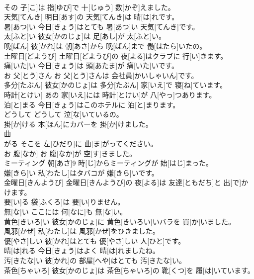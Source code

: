 \documentclass[8pt]{extreport}
\begin{document}
\begin{CJK}{UTF8}{min}
\\	[じゅう]	その 子[こ]は 指[ゆび]で 十[じゅう] 数[かぞ]えました。		
\\	天気[てんき]	明日[あす]の 天気[てんき]は 晴[は]れです。		
\\	暑[あつ]い	今日[きょう]はとても 暑[あつ]い 天気[てんき]です。		
\\	太[ふと]い	彼女[かのじょ]は 足[あし]が 太[ふと]い。		
\\	晩[ばん]	彼[かれ]は 朝[あさ]から 晩[ばん]まで 働[はたら]いたの。		
\\	土曜日[どようび]	土曜日[どようび]の 夜[よる]はクラブに 行[い]きます。		
\\	痛[いた]い	今日[きょう]は 頭[あたま]が 痛[いた]いです。		
\\	お 父[とう]さん	お 父[とう]さんは 会社員[かいしゃいん]です。		
\\	多分[たぶん]	彼女[かのじょ]は 多分[たぶん] 家[いえ]で 寝[ね]ています。		
\\	時計[とけい]	あの 家[いえ]には 時計[とけい]が 八[やっ]つあります。		
\\	泊[と]まる	今日[きょう]はこのホテルに 泊[と]まります。		
\\	どうして	どうして 泣[な]いているの。		
\\	掛[か]ける	本[ほん]にカバーを 掛[か]けました。		
\\	曲
\\	[ま]がる	そこを 左[ひだり]に 曲[ま]がってください。		
\\	お 腹[なか]	お 腹[なか]が 空[す]きました。		
\\	ミーティング	朝[あさ]9 時[じ]からミーティングが 始[はじ]まった。		
\\	嫌[きら]い	私[わたし]はタバコが 嫌[きら]いです。		
\\	金曜日[きんようび]	金曜日[きんようび]の 夜[よる]は 友達[ともだち]と 出[で]かけます。		
\\	要[い]る	袋[ふくろ]は 要[い]りません。		
\\	無[な]い	ここには 何[なに]も 無[な]い。		
\\	黄色[きいろ]い	彼女[かのじょ]に 黄色[きいろい]いバラを 買[か]いました。		
\\	風邪[かぜ]	私[わたし]は 風邪[かぜ]をひきました。		
\\	優[やさ]しい	彼[かれ]はとても 優[やさ]しい 人[ひと]です。		
\\	晴[は]れる	今日[きょう]はよく 晴[は]れましたね。		
\\	汚[きたな]い	彼[かれ]の 部屋[へや]はとても 汚[きたな]い。		
\\	茶色[ちゃいろ]	彼女[かのじょ]は 茶色[ちゃいろ]の 靴[くつ]を 履[は]いています。		

\end{CJK}
\end{document}
